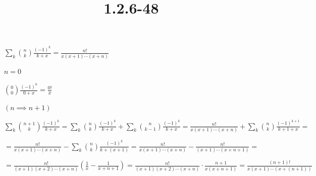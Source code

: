 \documentclass{article}
\title{1.2.6-48}
\begin{document}
\maketitle

\( \sum_k \binom{n}{k} \frac{(-1)^k}{k+x} = \frac{n!}{x(x+1)\cdots(x+n)} \)

\( n = 0 \)

\( \binom{0}{0} \frac{(-1)^0}{0+x} = \frac{0!}{x} \)

\( (n \implies n + 1) \)

\( \sum_k \binom{n+1}{k} \frac{(-1)^k}{k+x} = \sum_k \binom{n}{k} \frac{(-1)^k}{k+x} + \sum_k \binom{n}{k-1} \frac{(-1)^k}{k+x} = \frac{n!}{x(x+1)\cdots(x+n)} + \sum_k \binom{n}{k}\frac{(-1)^{k+1}}{k+1+x} = \)

\( = \frac{n!}{x(x+1)\cdots(x+n)} - \sum_k \binom{n}{k}\frac{(-1)^{k}}{k+(x+1)} = \frac{n!}{x(x+1)\cdots(x+n)} - \frac{n!}{(x+1)\cdots(x+n+1)} = \)

\( = \frac{n!}{(x+1)(x+2)\cdots(x+n)} (\frac{1}{x} - \frac{1}{x+n+1}) = \frac{n!}{(x+1)(x+2)\cdots(x+n)} \cdot \frac{n+1}{x(x+n+1)} = \frac{(n+1)!}{x(x+1)\cdots(x+(n+1))} \)
\end{document}

